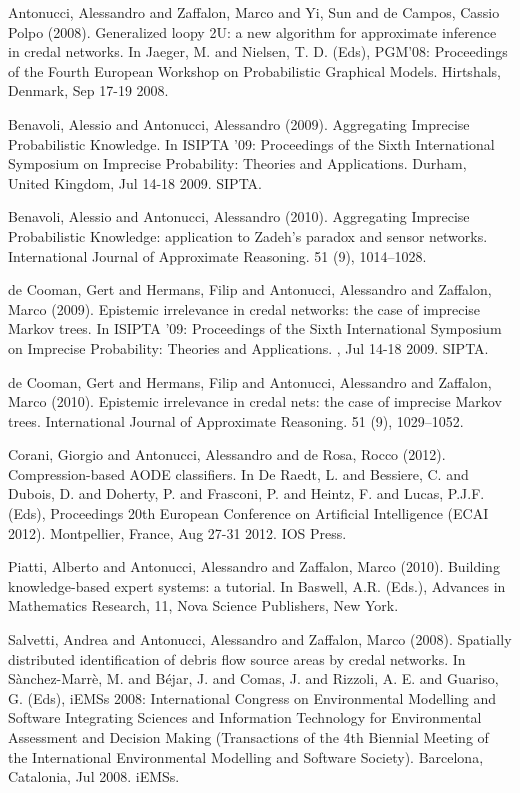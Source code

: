 \begin{cventries}
\begin{cvitems}
\item Antonucci, Alessandro and Zaffalon, Marco and Yi, Sun and de Campos, Cassio Polpo (2008).   Generalized loopy 2U: a new algorithm for approximate inference in credal networks.   In Jaeger, M. and Nielsen, T. D. (Eds), PGM’08: Proceedings of the Fourth European Workshop on Probabilistic Graphical Models.   Hirtshals, Denmark,   Sep 17-19 2008.
\item Benavoli, Alessio and Antonucci, Alessandro (2009).   Aggregating Imprecise Probabilistic Knowledge.   In ISIPTA ’09: Proceedings of the Sixth International Symposium on Imprecise Probability: Theories and Applications.   Durham, United Kingdom,   Jul 14-18 2009.   SIPTA.
\item Benavoli, Alessio and Antonucci, Alessandro (2010).   Aggregating Imprecise Probabilistic Knowledge: application to Zadeh’s paradox and sensor networks.   International Journal of Approximate Reasoning. 51 (9), 1014–1028.
\item de Cooman, Gert and Hermans, Filip and Antonucci, Alessandro and Zaffalon, Marco (2009).   Epistemic irrelevance in credal networks: the case of imprecise Markov trees.   In ISIPTA ’09: Proceedings of the Sixth International Symposium on Imprecise Probability: Theories and Applications.   ,   Jul 14-18 2009.   SIPTA.
\item de Cooman, Gert and Hermans, Filip and Antonucci, Alessandro and Zaffalon, Marco (2010).   Epistemic irrelevance in credal nets: the case of imprecise Markov trees.   International Journal of Approximate Reasoning. 51 (9), 1029–1052.
\item Corani, Giorgio and Antonucci, Alessandro and de Rosa, Rocco (2012).   Compression-based AODE classifiers.   In De Raedt, L. and Bessiere, C. and Dubois, D. and Doherty, P. and Frasconi, P. and Heintz, F. and Lucas, P.J.F. (Eds), Proceedings 20th European Conference on Artificial Intelligence (ECAI 2012).   Montpellier, France,   Aug 27-31 2012.   IOS Press.
\item Piatti, Alberto and Antonucci, Alessandro and Zaffalon, Marco (2010).   Building knowledge-based expert systems: a tutorial.   In Baswell, A.R. (Eds.), Advances in Mathematics Research, 11, Nova Science Publishers, New York.
\item Salvetti, Andrea and Antonucci, Alessandro and Zaffalon, Marco (2008).   Spatially distributed identification of debris flow source areas by credal networks.   In Sànchez-Marrè, M. and Béjar, J. and Comas, J. and Rizzoli, A. E. and Guariso, G. (Eds), iEMSs 2008: International Congress on Environmental Modelling and Software Integrating Sciences and Information Technology for Environmental Assessment and Decision Making (Transactions of the 4th Biennial Meeting of the International Environmental Modelling and Software Society).   Barcelona, Catalonia,   Jul 2008.   iEMSs.
\end{cvitems}
\end{cventries}
\vskip 2mm
